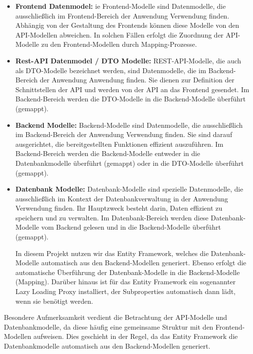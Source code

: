 \begin{itemize}
  \item \textbf{Frontend Datenmodel:} ie Frontend-Modelle sind Datenmodelle, die ausschließlich im Frontend-Bereich der 
  Anwendung Verwendung finden. Abhängig von der Gestaltung des Frontends können diese Modelle von den API-Modellen abweichen. 
  In solchen Fällen erfolgt die Zuordnung der API-Modelle zu den Frontend-Modellen durch Mapping-Prozesse.
  \item \textbf{Rest-API Datenmodel / DTO Modelle:} REST-API-Modelle, die auch als DTO-Modelle bezeichnet werden, sind Datenmodelle, 
  die im Backend-Bereich der Anwendung Anwendung finden. Sie dienen zur Definition der Schnittstellen der API und werden von der API an 
  das Frontend gesendet. Im Backend-Bereich werden die DTO-Modelle in die Backend-Modelle überführt (gemappt).
  \item \textbf{Backend Modelle:} Backend-Modelle sind Datenmodelle, die ausschließlich im Backend-Bereich der Anwendung Verwendung finden. 
  Sie sind darauf ausgerichtet, die bereitgestellten Funktionen effizient auszuführen. Im Backend-Bereich werden die Backend-Modelle 
  entweder in die Datenbankmodelle überführt (gemappt) oder in die DTO-Modelle überführt (gemappt).
  \item \textbf{Datenbank Modelle:} Datenbank-Modelle sind spezielle Datenmodelle, die ausschließlich im Kontext der Datenbankverwaltung 
  in der Anwendung Verwendung finden. Ihr Hauptzweck besteht darin, Daten effizient zu speichern und zu verwalten. 
  Im Datenbank-Bereich werden diese Datenbank-Modelle vom Backend gelesen und in die Backend-Modelle überführt (gemappt).

  In diesem Projekt nutzen wir das Entity Framework, welches die Datenbank-Modelle automatisch aus den Backend-Modellen generiert. 
  Ebenso erfolgt die automatische Überführung der Datenbank-Modelle in die Backend-Modelle (Mapping). 
  Darüber hinaus ist für das Entity Framework ein sogenannter Lazy Loading Proxy installiert, der Subproperties automatisch dann 
  lädt, wenn sie benötigt werden.
\end{itemize}


\noindent Besondere Aufmerksamkeit verdient die Betrachtung der API-Modelle und Datenbankmodelle, da diese häufig eine gemeinsame Struktur
 mit den Frontend-Modellen aufweisen. Dies geschieht in der Regel, da das Entity Framework die Datenbankmodelle automatisch aus
den Backend-Modellen generiert. \newline

